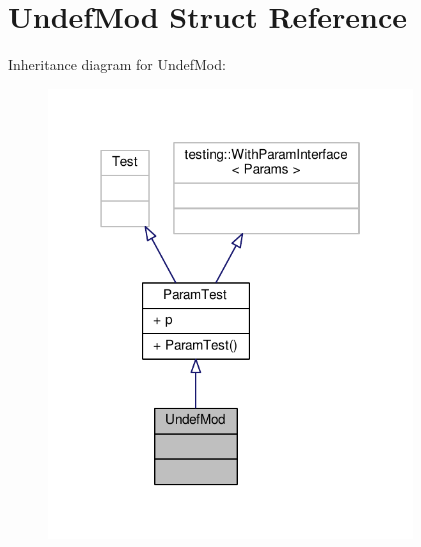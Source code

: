 \hypertarget{struct_undef_mod}{}\section{Undef\+Mod Struct Reference}
\label{struct_undef_mod}


Inheritance diagram for Undef\+Mod\+:
\nopagebreak
\begin{figure}[H]
\begin{center}
\leavevmode
\includegraphics[width=274pt]{struct_undef_mod__inherit__graph}
\end{center}
\end{figure}


